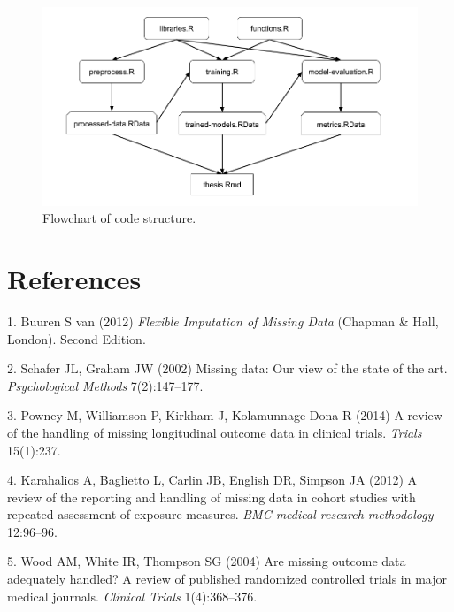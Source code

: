 \documentclass[12pt,]{article}
\begin{document}
\begin{figure}[H]

{\centering \includegraphics[width=1\linewidth]{images/r-code-chart} 

}

\caption{\label{fig:r-code-chart}Flowchart of code structure.}\label{fig:unnamed-chunk-17}
\end{figure}

\newpage

\section*{References}\label{references}

\hypertarget{refs}{}
\hypertarget{ref-van_buuren_flexible_2012}{}
1. Buuren S van (2012) \emph{Flexible Imputation of Missing Data}
(Chapman \& Hall, London). Second Edition.

\hypertarget{ref-schafer_missing_2002}{}
2. Schafer JL, Graham JW (2002) Missing data: Our view of the state of
the art. \emph{Psychological Methods} 7(2):147--177.

\hypertarget{ref-powney_review_2014}{}
3. Powney M, Williamson P, Kirkham J, Kolamunnage-Dona R (2014) A review
of the handling of missing longitudinal outcome data in clinical trials.
\emph{Trials} 15(1):237.

\hypertarget{ref-karahalios_review_2012}{}
4. Karahalios A, Baglietto L, Carlin JB, English DR, Simpson JA (2012) A
review of the reporting and handling of missing data in cohort studies
with repeated assessment of exposure measures. \emph{BMC medical
research methodology} 12:96--96.

\hypertarget{ref-wood_are_2004}{}
5. Wood AM, White IR, Thompson SG (2004) Are missing outcome data
adequately handled? A review of published randomized controlled trials
in major medical journals. \emph{Clinical Trials} 1(4):368--376.
\end{document}
